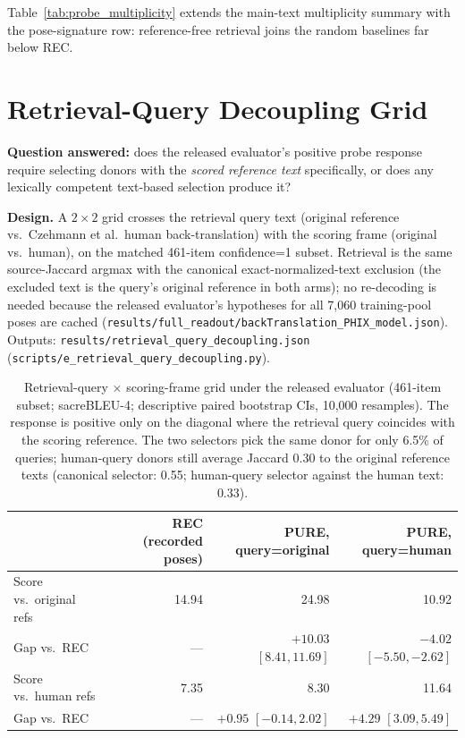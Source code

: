 \documentclass[pdflatex,sn-chicago]{sn-jnl}
\begin{document}
Table~\ref{tab:probe_multiplicity} extends the main-text multiplicity summary with the pose-signature row: reference-free retrieval joins the random baselines far below REC.

\section{Retrieval-Query Decoupling Grid}
\label{sec:appendix_query_decoupling}
\textbf{Question answered:} does the released evaluator's positive probe response require selecting donors with the \emph{scored reference text} specifically, or does any lexically competent text-based selection produce it?

\textbf{Design.} A $2\times2$ grid crosses the retrieval query text (original reference vs.\ Czehmann et al.\ human back-translation) with the scoring frame (original vs.\ human), on the matched 461-item confidence=1 subset. Retrieval is the same source-Jaccard argmax with the canonical exact-normalized-text exclusion (the excluded text is the query's original reference in both arms); no re-decoding is needed because the released evaluator's hypotheses for all 7{,}060 training-pool poses are cached (\texttt{results/full\_readout/backTranslation\_PHIX\_model.json}). Outputs: \texttt{results/retrieval\_query\_decoupling.json} (\texttt{scripts/e\_retrieval\_query\_decoupling.py}).

\begin{table}[h]
\centering
\small
\caption{Retrieval-query $\times$ scoring-frame grid under the released evaluator (461-item subset; sacreBLEU-4; descriptive paired bootstrap CIs, 10{,}000 resamples). The response is positive only on the diagonal where the retrieval query coincides with the scoring reference. The two selectors pick the same donor for only 6.5\% of queries; human-query donors still average Jaccard 0.30 to the original reference texts (canonical selector: 0.55; human-query selector against the human text: 0.33).}
\label{tab:query_decoupling}
\begin{tabular}{lrrr}
\toprule
 & REC (recorded poses) & PURE, query=original & PURE, query=human \\
\midrule
Score vs.\ original refs & 14.94 & 24.98 & 10.92 \\
Gap vs.\ REC & --- & $+10.03$ $[8.41,11.69]$ & $-4.02$ $[-5.50,-2.62]$ \\
\midrule
Score vs.\ human refs & 7.35 & 8.30 & 11.64 \\
Gap vs.\ REC & --- & $+0.95$ $[-0.14,2.02]$ & $+4.29$ $[3.09,5.49]$ \\
\bottomrule
\end{tabular}
\end{table}
\end{document}

